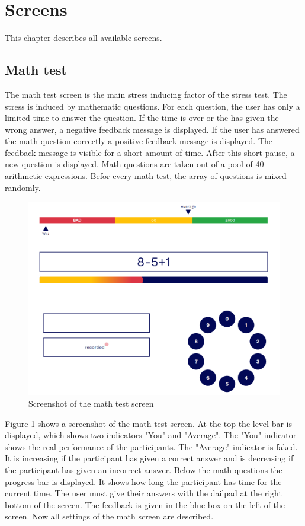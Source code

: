 \section{Screens}
\label{sec:screens}

This chapter describes all available screens.

\subsection{Math test}
\label{sec:screens-math-test}

The math test screen is the main stress inducing factor of the stress test.
The stress is induced by mathematic questions. 
For each question, the user has only a limited time to answer the question. 
If the time is over or the has given the wrong answer, a negative feedback message is displayed. 
If the user has answered the math question correctly a positive feedback message is displayed. 
The feedback message is visible for a short amount of time. 
After this short pause, a new question is displayed.
Math questions are taken out of a pool of 40 arithmetic expressions. 
Befor every math test, the array of questions is mixed randomly.

\begin{figure}[htb]
  \centering
  \includegraphics[width=\textwidth]{figures/Math-test.png}
  \caption{Screenshot of the math test screen}
  \label{fig:screenshot-math-test-screen}
\end{figure}

Figure \ref{fig:screenshot-math-test-screen} shows a screenshot of the math test screen.
At the top the level bar is displayed, which shows two indicators "You" and "Average".
The "You" indicator shows the real performance of the participants.
The "Average" indicator is faked.
It is increasing if the participant has given a correct answer and is decreasing if the participant has given an incorrect answer.
Below the math questions the progress bar is displayed.
It shows how long the participant has time for the current time.
The user must give their answers with the dailpad at the right bottom of the screen.
The feedback is given in the blue box on the left of the screen.
Now all settings of the math screen are described.

